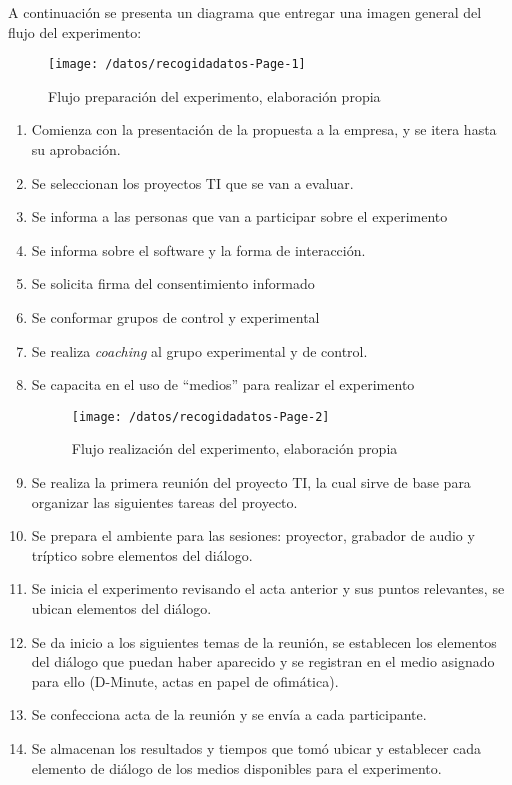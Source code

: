 A continuación se presenta un diagrama que entregar una imagen general del flujo del experimento:

\begin{figure}[!h]
\centering
\texttt{[image: /datos/recogidadatos-Page-1]}
\caption{Flujo preparación del experimento,  elaboración propia} 
\label{img5-2}
\end{figure}

\begin{enumerate}[1.]
	\item Comienza con la presentación de la propuesta a la empresa, y se itera hasta su aprobación.
	\item Se seleccionan los proyectos TI que se van a evaluar.
	\item Se informa a las personas que van a participar sobre el experimento 
	\item Se informa sobre el software y la forma de interacción.
	\item Se solicita firma del consentimiento informado
	\item Se conformar grupos de control y experimental
	\item Se realiza \textit{coaching} al grupo experimental y de control.
	\item Se capacita en el uso de “medios” para realizar el experimento

\begin{figure}[!h]
\centering
\texttt{[image: /datos/recogidadatos-Page-2]}
\caption{Flujo realización del experimento,  elaboración propia} 
\label{img5-3}
\end{figure}

	\item Se realiza la primera reunión del proyecto TI, la cual sirve de base para organizar las siguientes tareas del proyecto.
	\item Se prepara el ambiente para las sesiones: proyector, grabador de audio y tríptico sobre elementos del diálogo.
	\item Se inicia el experimento revisando el acta anterior y sus puntos relevantes, se ubican elementos del diálogo.
	\item Se da inicio a los siguientes temas de la reunión, se establecen los elementos del diálogo que puedan haber aparecido y se registran en el medio asignado para ello (D-Minute, actas en papel de ofimática).
	\item Se confecciona acta de la reunión y se envía a cada participante.
	\item Se almacenan los resultados y tiempos que tomó ubicar y establecer cada elemento de diálogo de los medios disponibles para el experimento.


\end{enumerate}
